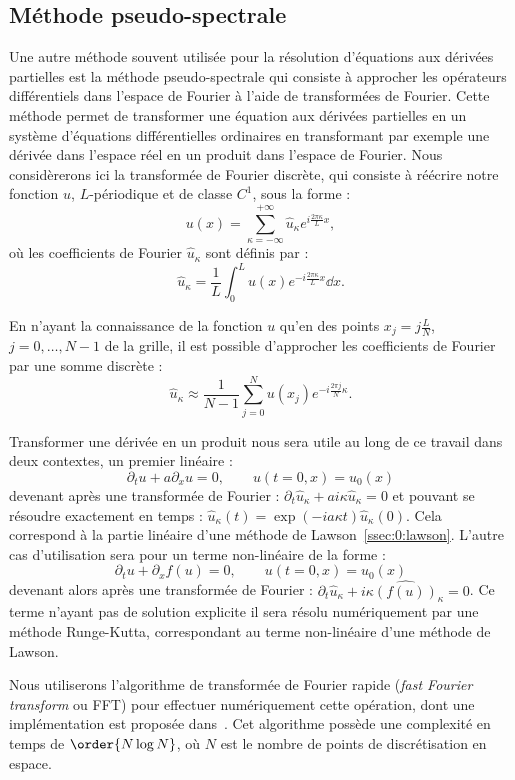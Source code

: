\subsection{Méthode pseudo-spectrale}

Une autre méthode souvent utilisée pour la résolution d'équations aux dérivées partielles est la méthode pseudo-spectrale qui consiste à approcher les opérateurs différentiels dans l'espace de Fourier à l'aide de transformées de Fourier. Cette méthode permet de transformer une équation aux dérivées partielles en un système d'équations différentielles ordinaires en transformant par exemple une dérivée dans l'espace réel en un produit dans l'espace de Fourier. Nous considèrerons ici la transformée de Fourier discrète, qui consiste à réécrire notre fonction $u$, $L$-périodique et de classe $C^1$, sous la forme :
$$
  u(x) = \sum_{\kappa=-\infty}^{+\infty} \hat{u}_\kappa e^{i\frac{2\pi \kappa}{L}x},
$$
où les coefficients de Fourier $\hat{u}_\kappa$ sont définis par :
$$
  \hat{u}_\kappa = \frac{1}{L}\int_0^L u(x)e^{-i\frac{2\pi \kappa}{L}x}\dd{x}.
$$

En n'ayant la connaissance de la fonction $u$ qu'en des points $x_j = j\frac{L}{N}$, $j=0,\dots,N-1$ de la grille, il est possible d'approcher les coefficients de Fourier par une somme discrète :
$$
  \hat{u}_\kappa \approx \frac{1}{N-1}\sum_{j=0}^N u(x_j) e^{-i\frac{2\pi j}{N}\kappa}.
$$

Transformer une dérivée en un produit nous sera utile au long de ce travail dans deux contextes, un premier linéaire :
$$
  \partial_t u + a\partial_x u = 0,\qquad u(t=0,x)=u_0(x)
$$
devenant après une transformée de Fourier : $\partial_t \hat{u}_\kappa + ai\kappa \hat{u}_\kappa = 0$ et pouvant se résoudre exactement en temps : $\hat{u}_\kappa(t) = \exp(-ia\kappa t)\hat{u}_\kappa(0)$. Cela correspond à la partie linéaire d'une méthode de Lawson~\ref{ssec:0:lawson}. L'autre cas d'utilisation sera pour un terme non-linéaire de la forme :
$$
  \partial_t u + \partial_xf(u) = 0,\qquad u(t=0,x)=u_0(x)
$$
devenant alors après une transformée de Fourier : $\partial_t\hat{u}_\kappa + i\kappa\widehat{\left(f(u)\right)}_\kappa = 0$. Ce terme n'ayant pas de solution explicite il sera résolu numériquement par une méthode Runge-Kutta, correspondant au terme non-linéaire d'une méthode de Lawson.

Nous utiliserons l'algorithme de transformée de Fourier rapide (\emph{fast Fourier transform} ou FFT) pour effectuer numériquement cette opération, dont une implémentation est proposée dans~\cite{Saramito:2013}. Cet algorithme possède une complexité en temps de $\order{N\log N}$, où $N$ est le nombre de points de discrétisation en espace.
